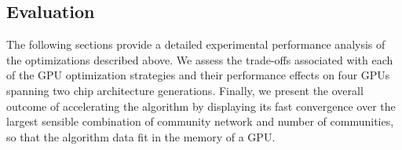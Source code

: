 \subsection{Evaluation}
\label{sec-evaluation}

The following sections provide a detailed experimental performance analysis
of the optimizations described above.
%
We assess the trade-offs associated with each of the GPU optimization
strategies and their performance effects on four GPUs spanning two chip
architecture generations.
%
Finally, we present the overall outcome of accelerating the algorithm by
displaying its fast convergence over the largest sensible combination of
community network and number of communities, so that the algorithm data fit in the
memory of a GPU.




% 


